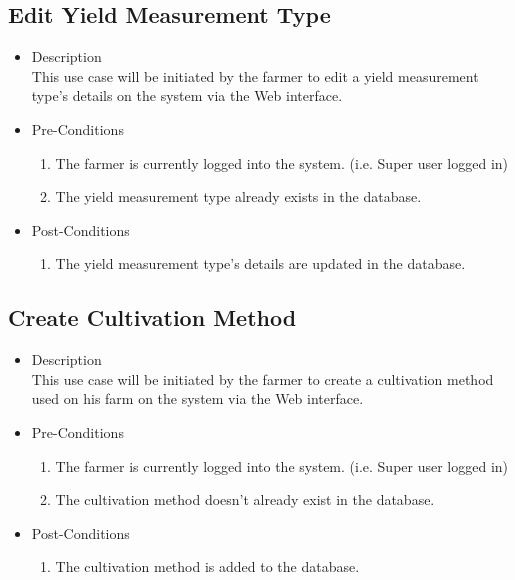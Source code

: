 \documentclass[11pt,fleqn]{book} %
\begin{document}
		\subsection{Edit Yield Measurement Type}
		\begin{itemize}
			\item Description\\
			This use case will be initiated by the farmer to edit a yield measurement type’s details on the system via the Web interface.
			\item Pre-Conditions
			\begin{enumerate}
				\item The farmer is currently logged into the system. (i.e. Super user logged in)
				\item The yield measurement type already exists in the database.					
			\end{enumerate}
			\item Post-Conditions
			\begin{enumerate}
				\item The yield measurement type’s details are updated in the database.
			\end{enumerate}
		\end{itemize}
		
		\subsection{Create Cultivation Method}
		\begin{itemize}
			\item Description\\
			This use case will be initiated by the farmer to create a cultivation method used on his farm on the system via the Web interface.
			\item Pre-Conditions
			\begin{enumerate}
				\item The farmer is currently logged into the system. (i.e. Super user logged in)
				\item The cultivation method doesn’t already exist in the database. 				
			\end{enumerate}
			\item Post-Conditions
			\begin{enumerate}
				\item The cultivation method is added to the database.
			\end{enumerate}
		\end{itemize}
		
\end{document}
